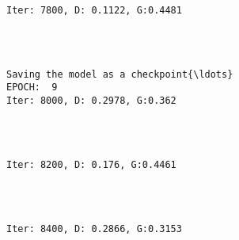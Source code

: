 \documentclass[11pt]{article}
\begin{document}
    \begin{Verbatim}[commandchars=\\\{\}]

Iter: 7800, D: 0.1122, G:0.4481
    \end{Verbatim}

    \begin{center}
    \end{center}
    { \hspace*{\fill} \\}
    
    \begin{Verbatim}[commandchars=\\\{\}]

Saving the model as a checkpoint{\ldots}
EPOCH:  9
Iter: 8000, D: 0.2978, G:0.362
    \end{Verbatim}

    \begin{center}
    \end{center}
    { \hspace*{\fill} \\}
    
    \begin{Verbatim}[commandchars=\\\{\}]

Iter: 8200, D: 0.176, G:0.4461
    \end{Verbatim}

    \begin{center}
    \end{center}
    { \hspace*{\fill} \\}
    
    \begin{Verbatim}[commandchars=\\\{\}]

Iter: 8400, D: 0.2866, G:0.3153
    \end{Verbatim}

    \begin{center}
    \end{center}
    { \hspace*{\fill} \\}
    
\end{document}
